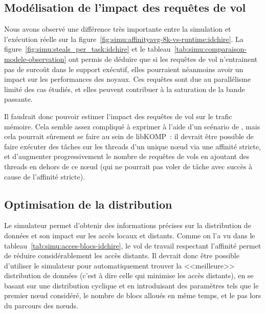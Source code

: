 \subsection{Modélisation de l'impact des requêtes de vol}

Nous avons observé une différence très importante entre la simulation et l'exécution réelle sur la figure~\ref{fig:simu:affinityavg-8k-vs-runtime:idchire}.
La figure~\ref{fig:simu:steals_per_task:idchire} et le tableau~\ref{tab:simu:comparaison-modele-observation} ont permis de déduire que si les requêtes de vol n'entrainent pas de surcoût dans le support exécutif, elles pourraient néanmoins avoir un impact sur les performances des noyaux.
Ces requêtes sont due au parallélisme limité des cas étudiés, et elles peuvent contribuer à la saturation de la bande passante.

Il faudrait donc pouvoir estimer l'impact des requêtes de vol sur le trafic mémoire.
Cela semble assez compliqué à exprimer à l'aide d'un scénario de \outil, mais cela pourrait sûrement se faire au sein de libKOMP~: il devrait être possible de faire exécuter des tâches sur les threads d'un unique nœud via une affinité stricte, et d'augmenter progressivement le nombre de requêtes de vols en ajoutant des threads en dehors de ce nœud (qui ne pourrait pas voler de tâche avec succès à cause de l'affinité stricte).


\subsection{Optimisation de la distribution}

Le simulateur permet d'obtenir des informations précises sur la distribution de données et son impact sur les accès locaux et distants.
Comme on l'a vu dans le tableau~\ref{tab:simu:acces-blocs-idchire}, le vol de travail respectant l'affinité permet de réduire considérablement les accès distants.
Il devrait donc être possible d'utiliser le simulateur pour automatiquement trouver la <<meilleure>> distribution de données (c'est à dire celle qui minimise les accès distants), en se basant sur une distribution cyclique et en introduisant des paramètres tels que le premier nœud considéré, le nombre de blocs alloués en même temps, et le pas lors du parcours des nœuds.
